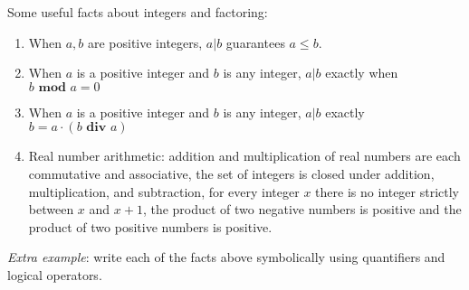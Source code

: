 
Some useful facts about integers and factoring:
\begin{enumerate}
\item When $a, b$ are positive integers, $a | b$ guarantees $a \leq b$.
\item When $a$ is a positive integer and $b$ is any integer, $a | b$
exactly when $b \textbf{ mod } a = 0$
\item When $a$ is a positive integer and $b$ is any integer, $a | b$
exactly $b = a \cdot (b \textbf{ div } a)$
\item Real number arithmetic: addition and multiplication of real 
 numbers are each commutative and associative, the set of integers
 is closed under addition, multiplication, and subtraction, 
 for every integer $x$ there is no integer strictly between $x$ and $x+1$, 
 the product of two negative numbers is positive and the product of two 
 positive numbers is positive.
\end{enumerate}

{\it Extra example}: write each of the facts above symbolically using 
quantifiers and logical operators.